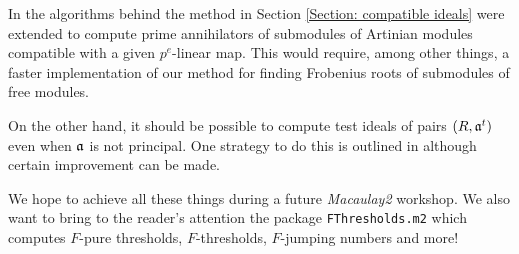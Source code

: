\documentclass[11pt]{amsart}
\begin{document}
In \cite{KatzmanZhangAlgorithm} the algorithms behind the method in Section \ref{Section: compatible ideals} were extended
to compute prime annihilators of submodules of Artinian modules compatible with a given $p^{e}$-linear map.
This would require, among other things, a faster implementation of our method for finding Frobenius roots of submodules of free modules.

On the other hand, it should be possible to compute test ideals of pairs $(R, \mathfrak{a}^t)$ even when $\mathfrak{a}$ is not principal.  One strategy to do this is outlined in \cite{SchwedeTuckerTestIdealsOfNonPrincipal} although certain improvement can be made.

We hope to achieve all these things during a future \emph{Macaulay2} workshop.  We also want to bring to the reader's attention the package \texttt{FThresholds.m2} which computes $F$-pure thresholds, $F$-thresholds, $F$-jumping numbers and more!



\end{document}
